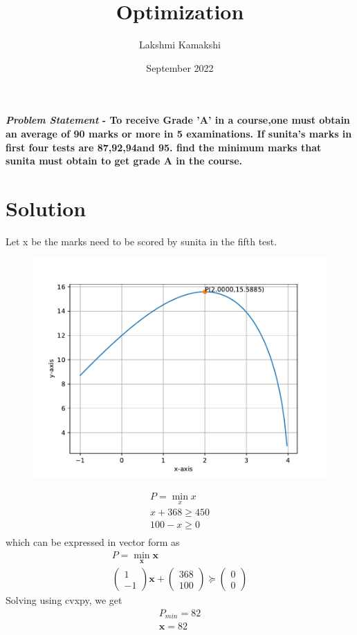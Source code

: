 \documentclass[journal,10pt,twocolumn]{article}
\title{\textbf{Optimization}}
\author{Lakshmi Kamakshi}
\date{September 2022}
\let\vec\mathbf
\newcommand{\myvec}[1]{\ensuremath{\begin{pmatrix}#1\end{pmatrix}}}
\begin{document}
\maketitle
\paragraph{\textit{Problem Statement} - To receive Grade 'A' in a course,one must obtain an average of 90 marks or more in 5 examinations. If sunita's marks in first four tests are 87,92,94and 95. find the minimum marks that sunita must obtain to get grade A in the course.} 
\section*{\large Solution}
Let x be the marks need to be scored by sunita in the fifth test.

\begin{figure}[h]
\includegraphics[width=1\columnwidth]{fig.pdf}
\end{figure}
\begin{align}
	P = \min_{x}x\\
	x + 368 \geq 450\\
	100 - x \geq 0 \\
\end{align}
which can be expressed in vector form as
\begin{align}
	P = \min_{\vec{x}}\vec{x}\\
	\myvec{1\\-1}\vec{x} + \myvec{368 \\ 100} \succeq \myvec{0\\0}
\end{align}
Solving using cvxpy, we get
\begin{align}
	P_{min} = 82\\
	\vec{x} = 82\\
\end{align}
\end{document}
